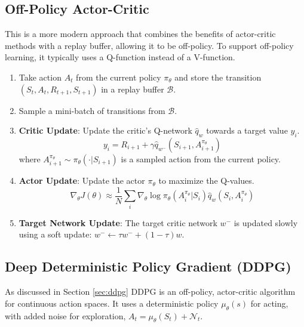 \documentclass[12pt]{article}
\begin{document}
\subsection{Off-Policy Actor-Critic}
This is a more modern approach that combines the benefits of actor-critic methods with a replay buffer, allowing it to be off-policy. To support off-policy learning, it typically uses a Q-function instead of a V-function.
\begin{enumerate}
    \item Take action $A_t$ from the current policy $\pi_\theta$ and store the transition $(S_t, A_t, R_{t+1}, S_{t+1})$ in a replay buffer $\mathcal{B}$.
    \item Sample a mini-batch of transitions from $\mathcal{B}$.
    \item \textbf{Critic Update}: Update the critic's Q-network $\hat{q}_w$ towards a target value $y_i$.
    $$ y_i = R_{i+1} + \gamma \hat{q}_{w^-}(S_{i+1}, A_{i+1}^{\pi_\theta}) $$
    where $A_{i+1}^{\pi_\theta} \sim \pi_\theta(\cdot|S_{i+1})$ is a sampled action from the current policy.
    \item \textbf{Actor Update}: Update the actor $\pi_\theta$ to maximize the Q-values.
    $$ \nabla_\theta J(\theta) \approx \frac{1}{N} \sum_i \nabla_\theta \log \pi_\theta(A_i^{\pi_\theta} | S_i) \hat{q}_w(S_i, A_i^{\pi_\theta}) $$
    \item \textbf{Target Network Update}: The target critic network $w^-$ is updated slowly using a soft update: $w^- \leftarrow \tau w^- + (1-\tau) w$.
\end{enumerate}

\subsection{Deep Deterministic Policy Gradient (DDPG)} 
As discussed in Section \ref{sec:ddpg} DDPG is an off-policy, actor-critic algorithm for continuous action spaces. It uses a deterministic policy $\mu_\theta(s)$ for acting, with added noise for exploration, $A_t = \mu_\theta(S_t) + \mathcal{N}_t$.
\end{document}
